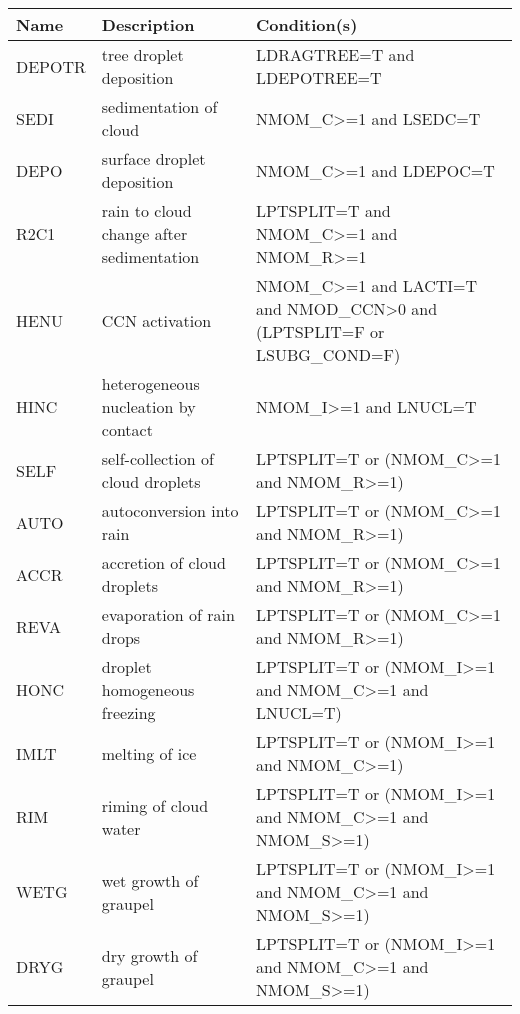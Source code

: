 \begin{longtable} {|p{}|p{}|p{}|}
\hline
Name & Description & Condition(s) \\
\hline \hline
\endhead
DEPOTR & tree droplet deposition                                  & LDRAGTREE=T and LDEPOTREE=T \\\hline
SEDI   & sedimentation of cloud                                   & NMOM\_C>=1 and LSEDC=T \\\hline
DEPO   & surface droplet deposition                               & NMOM\_C>=1 and LDEPOC=T \\\hline
R2C1   & rain to cloud change after sedimentation                 & LPTSPLIT=T and NMOM\_C>=1 and NMOM\_R>=1 \\\hline
HENU   & CCN activation                                           & NMOM\_C>=1 and LACTI=T and NMOD\_CCN>0 and (LPTSPLIT=F or LSUBG\_COND=F) \\\hline
HINC   & heterogeneous nucleation by contact                      & NMOM\_I>=1 and LNUCL=T \\\hline
SELF   & self-collection of cloud droplets                        & LPTSPLIT=T or (NMOM\_C>=1 and NMOM\_R>=1) \\\hline
AUTO   & autoconversion into rain                                 & LPTSPLIT=T or (NMOM\_C>=1 and NMOM\_R>=1) \\\hline
ACCR   & accretion of cloud droplets                              & LPTSPLIT=T or (NMOM\_C>=1 and NMOM\_R>=1) \\\hline
REVA   & evaporation of rain drops                                & LPTSPLIT=T or (NMOM\_C>=1 and NMOM\_R>=1) \\\hline
HONC   & droplet homogeneous freezing                             & LPTSPLIT=T or (NMOM\_I>=1 and NMOM\_C>=1 and LNUCL=T) \\\hline
IMLT   & melting of ice                                           & LPTSPLIT=T or (NMOM\_I>=1 and NMOM\_C>=1) \\\hline
RIM    & riming of cloud water                                    & LPTSPLIT=T or (NMOM\_I>=1 and NMOM\_C>=1 and NMOM\_S>=1) \\\hline
WETG   & wet growth of graupel                                    & LPTSPLIT=T or (NMOM\_I>=1 and NMOM\_C>=1 and NMOM\_S>=1) \\\hline
DRYG   & dry growth of graupel                                    & LPTSPLIT=T or (NMOM\_I>=1 and NMOM\_C>=1 and NMOM\_S>=1) \\\hline

\end{longtable}
